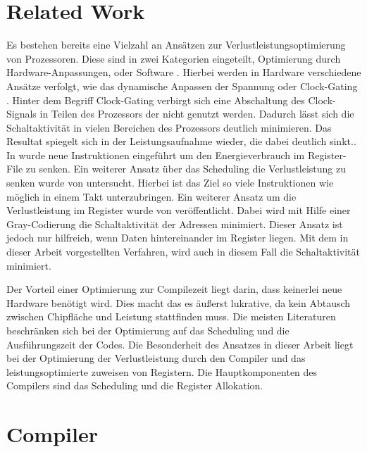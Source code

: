 \newpage
\section{Related Work}

Es bestehen bereits eine Vielzahl an Ansätzen zur Verlustleistungsoptimierung von Prozessoren. Diese sind in zwei Kategorien eingeteilt, Optimierung durch Hardware-Anpassungen\cite{wu2000clock, horowitz1994low, hajj1998architectural}, oder Software \cite{gebotys1997low, asanovic2000energy, toburen1998instruction, su1995cache }. Hierbei werden in Hardware verschiedene Ansätze verfolgt, wie das dynamische Anpassen der Spannung \cite{horowitz1994low} oder Clock-Gating \cite{wu2000clock}. Hinter dem Begriff Clock-Gating verbirgt sich eine Abschaltung des Clock-Signals in Teilen des Prozessors der nicht genutzt werden. Dadurch lässt sich die Schaltaktivität in vielen Bereichen des Prozessors deutlich minimieren. Das Resultat spiegelt sich in der Leistungsaufnahme wieder, die dabei deutlich sinkt.\cite{donno2003clock}. In \cite{asanovic2000energy} wurde neue Instruktionen eingeführt um den Energieverbrauch im Register-File zu senken. Ein weiterer Ansatz über das Scheduling die Verlustleistung zu senken wurde von \cite{toburen1998instruction} untersucht. Hierbei ist das Ziel so viele Instruktionen wie möglich in einem Takt unterzubringen.
Ein weiterer Ansatz um die Verlustleistung im Register wurde von \cite{su1995cache} veröffentlicht. Dabei wird mit Hilfe einer Gray-Codierung die Schaltaktivität der Adressen minimiert. Dieser Ansatz ist jedoch nur hilfreich, wenn Daten hintereinander im Register liegen. Mit dem in dieser Arbeit vorgestellten Verfahren, wird auch in diesem Fall die Schaltaktivität minimiert.

Der Vorteil einer Optimierung zur Compilezeit liegt darin, dass keinerlei neue Hardware benötigt wird. Dies macht das es äußerst lukrative, da kein Abtausch zwischen Chipfläche und Leistung stattfinden muss. Die meisten Literaturen beschränken sich bei der Optimierung auf das Scheduling und die Ausführungszeit der Codes. Die Besonderheit des Ansatzes in dieser Arbeit liegt bei der Optimierung der Verlustleistung durch den Compiler und das leistungsoptimierte zuweisen von Registern. Die Hauptkomponenten des Compilers sind das Scheduling und die Register Allokation.

\section{Compiler}

